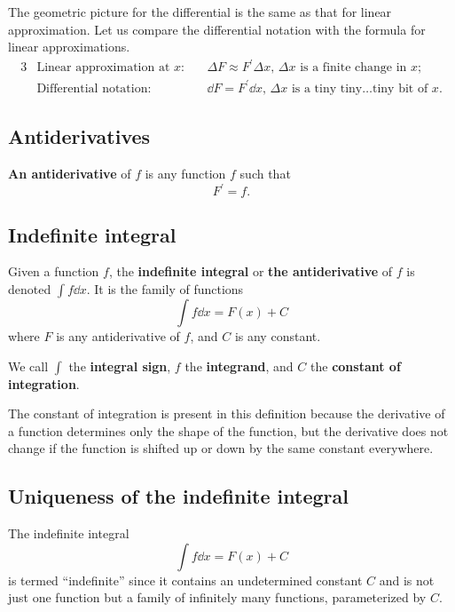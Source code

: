 The geometric picture for the differential is the same as that for linear approximation.
Let us compare the differential notation with the formula for linear approximations.
\begin{alignat*}{3}
& \text{Linear approximation at $x$:} & \: & \Delta F\approx F^\prime\Delta x\text{, $\Delta x$ is a finite change in $x$;}\\
& \text{Differential notation:}       &    & \dd F=F^\prime\dd x\text{, $\Delta x$ is a tiny tiny\ldots tiny bit of $x$.}
\end{alignat*}

\subsection{Antiderivatives}
\textbf{An antiderivative} of $f$ is any function $f$ such that
\[F^\prime=f.\]

\subsection{Indefinite integral}
Given a function $f$, the \textbf{indefinite integral} or \textbf{the antiderivative} of $f$ is denoted $\int f\dd x$. It is the family of functions
\[\int f\dd x=F(x)+C\]
where $F$ is any antiderivative of $f$, and $C$ is any constant.

We call $\int$ the \textbf{integral sign}, $f$ the \textbf{integrand}, and $C$ the \textbf{constant of integration}.

\begin{note}
The constant of integration is present in this definition because the derivative of a function determines only the shape of the function, but the derivative does not change if the function is shifted up or down by the same constant everywhere.
\end{note}

\subsection{Uniqueness of the indefinite integral}
The indefinite integral
\[\int f\dd x=F(x)+C\]
is termed ``indefinite'' since it contains an undetermined constant $C$ and is not just one function but a family of infinitely many functions, parameterized by $C$.

